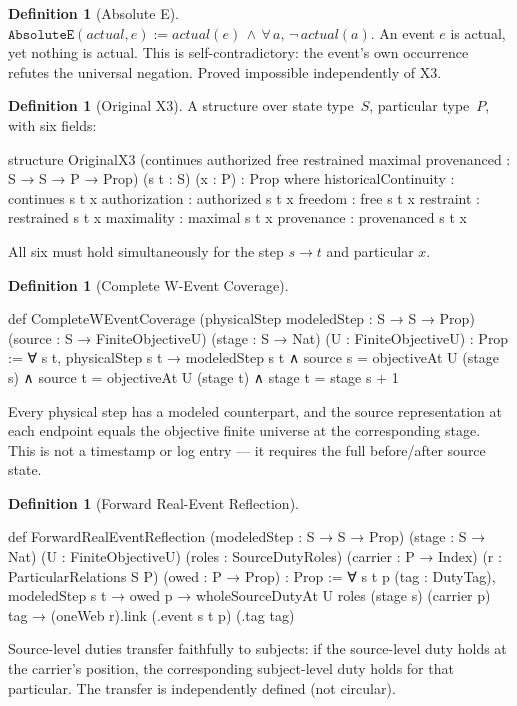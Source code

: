 \documentclass[11pt,a4paper]{article}
\theoremstyle{definition}
\newtheorem{definition}[theorem]{Definition}
\theoremstyle{remark}
\begin{document}
\begin{definition}[Absolute E]\label{def:absolute-e}
$\texttt{AbsoluteE}(\mathit{actual}, e) := \mathit{actual}(e) \,\wedge\, \forall\, a,\, \neg\, \mathit{actual}(a)$. An event $e$ is actual, yet nothing is actual. This is self-contradictory: the event's own occurrence refutes the universal negation. Proved impossible independently of X3.
\end{definition}

\begin{definition}[Original X3]\label{def:x3}
A structure over state type~$S$, particular type~$P$, with six fields:
\begin{leancode}
structure OriginalX3 (continues authorized free
    restrained maximal provenanced : S → S → P → Prop)
    (s t : S) (x : P) : Prop where
  historicalContinuity : continues s t x
  authorization        : authorized s t x
  freedom              : free s t x
  restraint            : restrained s t x
  maximality           : maximal s t x
  provenance           : provenanced s t x
\end{leancode}
All six must hold simultaneously for the step $s \to t$ and particular $x$.
\end{definition}

\begin{definition}[Complete W-Event Coverage]\label{def:coverage}
\begin{leancode}
def CompleteWEventCoverage (physicalStep modeledStep : S → S → Prop)
    (source : S → FiniteObjectiveU) (stage : S → Nat)
    (U : FiniteObjectiveU) : Prop :=
  ∀ s t, physicalStep s t →
    modeledStep s t ∧
    source s = objectiveAt U (stage s) ∧
    source t = objectiveAt U (stage t) ∧
    stage t = stage s + 1
\end{leancode}
Every physical step has a modeled counterpart, and the source representation at each endpoint equals the objective finite universe at the corresponding stage. This is not a timestamp or log entry --- it requires the full before/after source state.
\end{definition}

\begin{definition}[Forward Real-Event Reflection]\label{def:reflection}
\begin{leancode}
def ForwardRealEventReflection (modeledStep : S → S → Prop)
    (stage : S → Nat) (U : FiniteObjectiveU)
    (roles : SourceDutyRoles) (carrier : P → Index)
    (r : ParticularRelations S P) (owed : P → Prop) : Prop :=
  ∀ s t p (tag : DutyTag), modeledStep s t → owed p →
    wholeSourceDutyAt U roles (stage s) (carrier p) tag →
      (oneWeb r).link (.event s t p) (.tag tag)
\end{leancode}
Source-level duties transfer faithfully to subjects: if the source-level duty holds at the carrier's position, the corresponding subject-level duty holds for that particular. The transfer is independently defined (not circular).
\end{definition}
\end{document}
